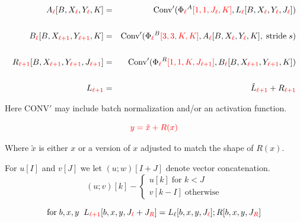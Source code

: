 {{\huge
\begin{eqnarray*}
A_{\color{red} \ell}[B,X_{\color{red} \ell},Y_{\color{red} \ell},K] & = & \mathrm{Conv}'(\Phi_{\color{red} \ell}^A{\color{red} [1,1,J_{\color{red} \ell},K]},L_{\color{red} \ell}[B,X_{\color{red} \ell},Y_{\color{red} \ell},J_{\color{red} \ell}]) \\
\\
B_{\color{red} \ell}[B,X_{\color{red} \ell+1},Y_{\color{red} \ell+1},K] & = & \mathrm{Conv}'(\Phi_{\color{red} \ell}^B{\color{red}[3,3,K,K]},A_{\color{red} \ell}[B,X_{\color{red} \ell},Y_{\color{red} \ell},K],\;\mathrm{stride}\;s) \\
\\
R_{\color{red} \ell+1}[B,X_{\color{red} \ell+1},Y_{\color{red} \ell+1},J_{\color{red} \ell+1}] & = & \mathrm{Conv}'(\Phi_{\color{red} \ell}^R{\color{red} [1,1,K,J_{\color{red} \ell+1}]},B_{\color{red} \ell}[B,X_{\color{red} \ell+1},Y_{\color{red} \ell+1},K]) \\
\\
L_{\color{red} \ell+1} & = & \tilde{L}_{\color{red} \ell+1} + R_{\color{red} \ell+1}
\end{eqnarray*}
}

\vfill
Here $\mathrm{CONV}'$ may include batch normalization and/or an activation function.


$${\color{red} y = \tilde{x} + R(x)}$$

\vfill
Where $\tilde{x}$ is either $x$ or a version of $x$ adjusted to match the shape of $R(x)$.


For {\color{red} $u[I]$} and {\color{red} $v[J]$} we let {\color{red} $(u;w)[I+J]$} denote vector concatenation.
\vfill
$$(u;v)[k] - \left\{\begin{array}{l} u[k]\;\mbox{for $k < J$} \\ v[k-I] \;\mbox{otherwise} \end{array}\right.$$

\vfill
$$\mbox{for}\;b,x,y\;\;L_{\color{red} \ell + 1}[b,x,y,J_{\color{red} \ell} + J_{\color{red} R}] = L_\ell[b,x,y,J_{\color{red} \ell}];R[b,x,y,J_{\color{red} R}]$$


}
